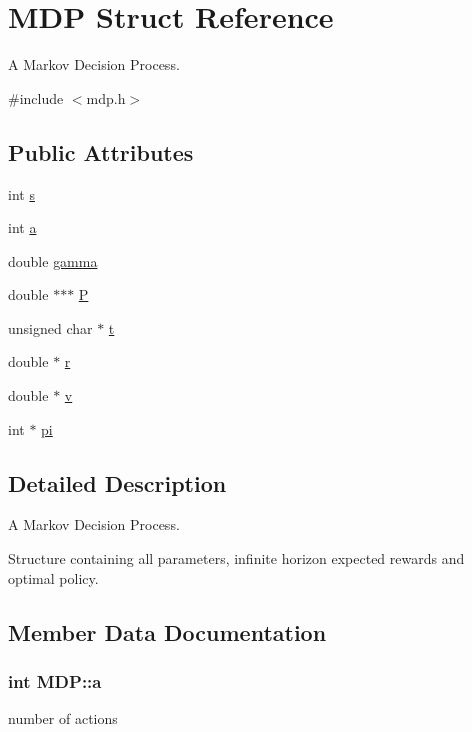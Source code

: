 \hypertarget{structMDP}{}\section{M\+DP Struct Reference}
\label{structMDP}


A Markov Decision Process.  




{\ttfamily \#include $<$mdp.\+h$>$}

\subsection*{Public Attributes}
\begin{DoxyCompactItemize}
\item 
int \hyperlink{structMDP_aa735fb802768fb82ff8e05eb9d99ef51}{s}
\item 
int \hyperlink{structMDP_ae25a44e2b3d9f22a4f3fd6296b3602c5}{a}
\item 
double \hyperlink{structMDP_a250e0cbf0b71eef0f71af97ca6773ff2}{gamma}
\item 
double $\ast$$\ast$$\ast$ \hyperlink{structMDP_a752db5e631de22e825b77dd4e052b195}{P}
\item 
unsigned char $\ast$ \hyperlink{structMDP_a70ae114113478796bd398bca88f32aa1}{t}
\item 
double $\ast$ \hyperlink{structMDP_a723a197ba7bcb6bc88e06cbee769166c}{r}
\item 
double $\ast$ \hyperlink{structMDP_aa2f74ec366c164a7121fd46a24cbabce}{v}
\item 
int $\ast$ \hyperlink{structMDP_aeba26ff8087d7dc83fda5bd779965928}{pi}
\end{DoxyCompactItemize}


\subsection{Detailed Description}
A Markov Decision Process. 

Structure containing all parameters, infinite horizon expected rewards and optimal policy. 

\subsection{Member Data Documentation}
\subsubsection[{\texorpdfstring{a}{a}}]{\setlength{\rightskip}{0pt plus 5cm}int M\+D\+P\+::a}\hypertarget{structMDP_ae25a44e2b3d9f22a4f3fd6296b3602c5}{}\label{structMDP_ae25a44e2b3d9f22a4f3fd6296b3602c5}
number of actions 

